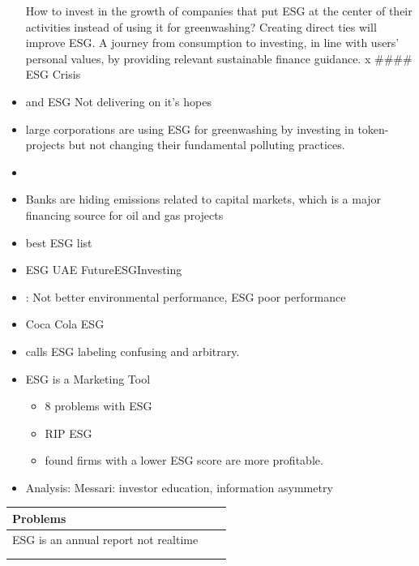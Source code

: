 \documentclass[
  letterpaper,
  DIV=11,
  numbers=noendperiod]{scrartcl}
\providecommand{\tightlist}{%
  \setlength{\itemsep}{0pt}\setlength{\parskip}{0pt}}\usepackage{longtable,booktabs,array}
\begin{document}
\begin{itemize}
  How to invest in the growth of companies that put ESG at the center of
  their activities instead of using it for greenwashing? Creating direct
  ties will improve ESG. A journey from consumption to investing, in
  line with users' personal values, by providing relevant sustainable
  finance guidance. x \#\#\#\# ESG Crisis
\item
  \citet{jamesphillippsESGCrisisJust2022} and
  \citet{FinancialMaterialityMarks2023} ESG Not delivering on it's hopes
\item
  \citet{tedxtalksDisruptiveNewModel2022} large corporations are using
  ESG for greenwashing by investing in token-projects but not changing
  their fundamental polluting practices.
\item
  \citet{margarytakirakosianRedFlagsPrivate2022}
\item
  Banks are hiding emissions related to capital markets, which is a
  major financing source for oil and gas projects
  \citet{wilkesExclusiveBanksVote2023}
\item
  \citet{dailyHereOurList2021} best ESG list
\item
  ESG UAE FutureESGInvesting
\item
  \citet{sanjaibhagatInconvenientTruthESG2022}: Not better environmental
  performance, ESG poor performance
\item
  \citet{simoes-coelhoBalancingGlobalCorporate2023} Coca Cola ESG
\item
  \citet{pietrocecereItTotalMess2023} calls ESG labeling confusing and
  arbitrary.
\item
  ESG is a Marketing Tool

  \begin{itemize}
  \tightlist
  \item
    \citet{gemmawoodwardGoodRiddanceESG2022} 8 problems with ESG
  \item
    \citet{agnewRIPESG2022} RIP ESG
  \item
    \citet{luoESGLiquidityStock2022} found firms with a lower ESG score
    are more profitable.
  \end{itemize}
\item
  Analysis: Messari: investor education, information asymmetry
\end{itemize}

\begin{longtable}[]{@{}lll@{}}
\toprule\noalign{}
Problems & & \\
\midrule\noalign{}
\endhead
\bottomrule\noalign{}
\endlastfoot
ESG is an annual report not realtime & & \\
& & \\
& & \\
\end{longtable}
\end{document}
